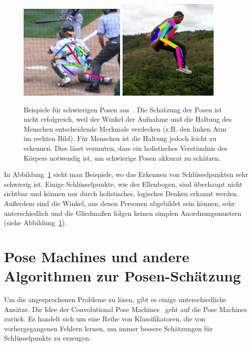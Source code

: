 \documentclass[journal, a4paper]{IEEEtran}
\begin{document}
        \begin{figure}[!hbt]
                \includegraphics[width=0.4\columnwidth]{hardpose_1.png}
                \includegraphics[width=0.35\columnwidth]{hardpose_2.png}
                \caption{Beispiele für schwierigen Posen aus~\cite{toshev2014deeppose}. Die Schätzung der Posen ist nicht erfolgreich, weil der Winkel der Aufnahme und die Haltung des Menschen entscheidende Merkmale verdecken (z.B. den linken Arm im rechten Bild). Für Menschen ist die Haltung jedoch leicht zu erkennen. Dies lässt vermuten, dass ein holistisches Verständnis des Körpers notwendig ist, um schwierige Posen akkurat zu schätzen.}
                \label{fig:hard_pose}
        \end{figure}
        In Abbildung~\ref{fig:hard_pose} sieht man Beispiele, wo das Erkennen von Schlüsselpunkten sehr schwierig ist. Einige Schlüsselpunkte, wie der Ellenbogen, sind überhaupt nicht sichtbar und können nur durch holistisches, logisches Denken erkannt werden.~\cite{toshev2014deeppose} Außerdem sind die Winkel, aus denen Personen abgebildet sein können, sehr unterschiedlich und die Gliedmaßen folgen keinen simplen Anordnungsmustern (siehe Abbildung~\ref{fig:hard_pose}).


\section{Pose Machines und andere Algorithmen zur Posen-Schätzung}
        Um die angesprochenen Probleme zu lösen, gibt es einige unterschiedliche Ansätze. %
        Die Idee der Convolutional Pose Machines~\cite{conv_pose} geht auf die Pose Machines~\cite{ramakrishna2014pose} zurück. Es handelt sich um eine Reihe von Klassifikatoren, die von vorhergegangenen Fehlern lernen, um immer bessere Schätzungen für Schlüsselpunkte zu erzeugen. 
\end{document}
